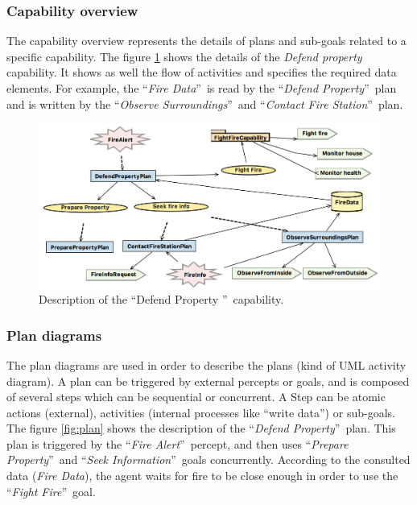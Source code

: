 \documentclass[12pt, a4paper]{memoir} %
\begin{document}
			\subsubsection{Capability overview}

				The capability overview represents the details of plans and sub-goals related to a specific capability. The figure \ref{fig:capability-overview}
				shows the details of the \textit{Defend property} capability. It shows as well the flow of activities and specifies the required data elements.
				For example, the \textquotedblleft\textit{Fire Data}\textquotedblright ~is read by the \textquotedblleft\textit{Defend Property}\textquotedblright ~plan
				and is written by the \textquotedblleft\textit{Observe Surroundings}\textquotedblright ~and \textquotedblleft\textit{Contact Fire Station}\textquotedblright ~plan.

				\begin{figure}
					\begin{center}
						\includegraphics[scale=0.4]{CapabilityOverview.png}
						\caption{\label{fig:capability-overview} Description of the \textquotedblleft Defend Property \textquotedblright ~capability.}
					\end{center}
				\end{figure}

			\subsubsection{Plan diagrams}

				The plan diagrams are used in order to describe the plans (kind of UML activity diagram). A plan can be triggered by external
				percepts or goals, and is composed of several steps which can be sequential or concurrent. A Step can be atomic actions
				(external), activities (internal processes like \textquotedblleft write data\textquotedblright) or sub-goals.
				The figure \ref{fig:plan} shows the description of the \textquotedblleft\textit{Defend Property}\textquotedblright ~plan. This plan is triggered by the
				\textquotedblleft\textit{Fire Alert}\textquotedblright ~percept, and then uses \textquotedblleft\textit{Prepare Property}\textquotedblright ~and
				\textquotedblleft\textit{Seek Information}\textquotedblright ~goals concurrently. According to the consulted data (\textit{Fire Data}), the agent
				waits for fire to be close enough in order to use the \textquotedblleft\textit{Fight Fire}\textquotedblright ~goal.
\end{document}
